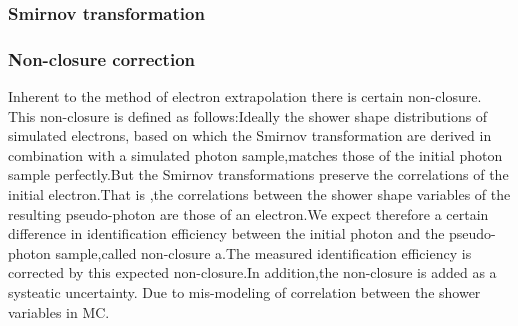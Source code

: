 \documentclass{ctexart}
\begin{document}
\subsubsection{Smirnov transformation}
\subsubsection{Non-closure correction}
Inherent to the method of electron extrapolation there is certain non-closure. This non-closure is defined as follows:Ideally the shower shape distributions of simulated electrons, based
 on which the Smirnov transformation are derived in combination with a simulated photon sample,matches those of the initial photon sample perfectly.But the Smirnov transformations preserve the correlations of the initial electron.That is ,the correlations between the shower shape variables of the resulting pseudo-photon are those of an electron.We expect therefore a certain difference in identification efficiency between the initial photon and the pseudo-photon sample,called non-closure a.The measured identification efficiency is corrected by this expected non-closure.In addition,the non-closure is added as a systeatic uncertainty. Due to mis-modeling of correlation between the shower variables in MC.
\end{document}
